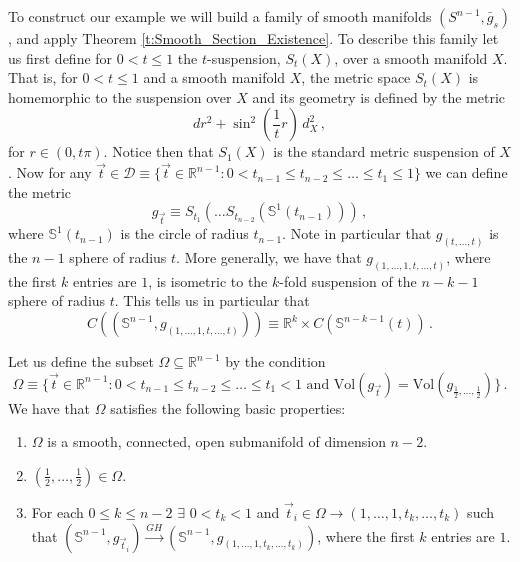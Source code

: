 \documentclass[11pt]{article}
\newcommand{\Vol}{\text{Vol}}
\newcommand{\RR}{\mathds{R}}
\newcommand{\Sn}{\mathds{S}}
\newcommand{\cD}{\mathcal{D}}
\begin{document}
To construct our example we will build a family of smooth manifolds $(S^{n-1},\bar g_s)$ , and apply Theorem \ref{t:Smooth_Section_Existence}.  To describe this family let us first define for $0<t\leq 1$ the $t$-suspension, $S_t(X)$, over a smooth manifold $X$.  That is, for $0<t\leq 1$ and a smooth manifold $X$, the metric space $S_t(X)$ is homemorphic to the suspension over $X$ and its geometry is defined by the metric
$$
dr^2+\sin^2(\frac{1}{t} r)\,d_X^2\, ,
$$
for $r\in (0,t\pi)$.  Notice then that $S_1(X)$ is the standard metric suspension of $X$.  Now for any $\vec t \in \cD\equiv \{\vec t\in \RR^{n-1}: 0<t_{n-1}\leq t_{n-2}\leq\ldots\leq t_{1}\leq 1\}$ we can define the metric
$$
g_{\vec t}\equiv S_{t_{1}}(\ldots S_{t_{n-2}}(\Sn^1(t_{n-1})))\, ,
$$
where $\Sn^1(t_{n-1})$ is the circle of radius $t_{n-1}$.  Note in particular that $g_{(t,\ldots,t)}$ is the $n-1$ sphere of radius $t$.  More generally, we have that $g_{(1,\ldots,1,t,\ldots,t)}$, where the first $k$ entries are $1$, is isometric to the $k$-fold suspension of the $n-k-1$ sphere of radius $t$.  This tells us in particular that
$$
C((\Sn^{n-1},g_{(1,\ldots,1,t,\ldots,t)}))\equiv \RR^k\times C(\Sn^{n-k-1}(t))\, .
$$

 Let us define the subset $\Omega\subseteq \RR^{n-1}$ by the condition 
$$
\Omega\equiv \{\vec t\in\RR^{n-1}:0<t_{n-1}\leq t_{n-2}\leq\ldots\leq t_{1}< 1\text{ and } \Vol(g_{\vec t})=\Vol(g_{\frac{1}{2},\ldots,\frac{1}{2}})\}\, .
$$
We have that $\Omega$ satisfies the following basic properties:
\begin{enumerate}
 \item $\Omega$ is a smooth, connected, open submanifold of dimension $n-2$.
 \item $(\frac{1}{2},\ldots,\frac{1}{2})\in\Omega$.
 \item For each $0\leq k\leq n-2$ $\exists$ $0<t_k<1$ and $\vec t_i\in\Omega\to (1,\ldots,1,t_k,\ldots,t_k)$ such that $(\Sn^{n-1},g_{\vec t_i})\stackrel{GH}{\rightarrow} (\Sn^{n-1},g_{(1,\ldots,1,t_k,\ldots,t_k)})$, where the first $k$ entries are $1$.
\end{enumerate}
\end{document}
